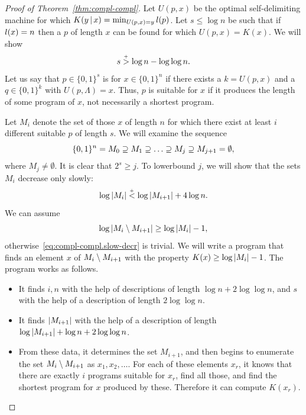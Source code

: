  \begin{proof}[Proof of Theorem~\protect\ref{thm:compl-compl}]
  \leanok
Let \( U(p, x) \) be the optimal self-delimiting machine for which
\( K(y \,\vert\, x) = \min_{U(p, x) = y} l(p) \).
Let \( s \le \log n \) be such that if \( l(x) = n \) then 
a \( p \) of length \( x \) can be found for which \( U(p, x) = K(x) \).
We will show
 \begin{equation}\label{eq:compl-compl.s-lb}
   s \stackrel{{}_+}{>} \log n - \log \log n.
 \end{equation}
Let us say that \( p \in \{0, 1\}^{s} \) is  for 
\( x \in \{0,1\}^{n} \) if there exists a \( k = U(p, x) \) and a
\( q \in \{0,1\}^{k} \) with \( U(p, \Lambda) = x \).
Thus, \( p \) is suitable for \( x \) if it produces the length of some program of
\( x \), not necessarily a shortest program.

Let \( M_{i} \) denote the set of those \( x \) of length \( n \)
for which there exist at least \( i \)
different suitable \( p \) of length \( s \).
We will examine the sequence
 \[
   \{0,1\}^{n} = M_{0} \spsq M_{1} \spsq \dots 
   \spsq M_{j} \spsq M_{j+1} = \emptyset,
 \]
where \( M_{j} \ne \emptyset \).
It is clear that \( 2^{s} \ge j \).
To lowerbound \( j \), we will show that the sets \( M_{i} \) decrease only slowly:
 \begin{equation}\label{eq:compl-compl.slow-decr}
  \log |M_{i}| \stackrel{{}_+}{<} \log|M_{i+1}| + 4 \log n.
 \end{equation}
We can assume 
 \begin{equation}\label{eq:compl-compl.assume}
   \log|M_{i} \setminus M_{i+1}| \ge \log|M_{i}| - 1,
 \end{equation}
otherwise~\eqref{eq:compl-compl.slow-decr} is trivial.
We will write a program that finds an element \( x \) of 
\( M_{i} \setminus M_{i+1} \) with the property \( K(x) \ge \log|M_{i}| - 1 \).
The program works as follows.
 \begin{itemize}

  \item It finds \( i,n \) with the help of descriptions of length
\( \log n + 2\log\log n \), and \( s \) with the help of a description of length
\( 2 \log\log n \).

  \item It finds  \( |M_{i+1}| \) with the help of a description of length
\( \log|M_{i+1}| + \log n + 2\log\log n \).

  \item From these data, it determines the set \( M_{i+1} \), and then begins
to enumerate the set \( M_{i} \setminus M_{i+1} \) as \( x_{1}, x_{2},\dotsc \).
For each of these elements \( x_{r} \), it knows that there are exactly \( i \)
programs suitable for \( x_{r} \), find all those, and find the shortest
program for \( x \) produced by these.
Therefore it can compute \( K(x_{r}) \).


\end{itemize}
\end{proof}
